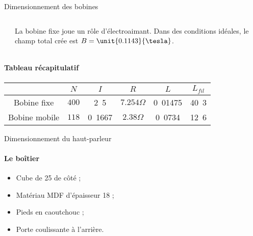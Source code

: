\documentclass[pdf]{beamer}
\begin{document}
\begin{frame}{Dimensionnement des bobines}

	\begin{columns}
		\begin{column}{5cm}
		\end{column}

		\begin{column}{5cm}
			La bobine fixe joue un rôle d'électroaimant. Dans des conditions idéales, le champ total crée est $B = \unit{0.1143}{\tesla}$.
		\end{column}
	\end{columns}

	\bigbreak

	\paragraph{\textbf{Tableau récapitulatif}}
	\small
	{
		\begin{center}
		\begin{tabular}{c|c|c|c|c|c}
										& $N$ 	& $I$ 										& $R$ 								& $L$ 										& $L_{fil}$ \\
			\hline
			Bobine fixe 	& $400$ & \unit{2.5}{\ampere} 		& $7.254\Omega$ 	& \unit{0.01475}{\henry} 	& \unit{40.3}{\meter} \\
			\hline
			Bobine mobile & $118$ & \unit{0.1667}{\ampere}  & $2.38\Omega$ 	& \unit{0.0734}{\henry} 	& \unit{12.6}{\meter} \\
		\end{tabular}
		\end{center}
	}
\end{frame}

\begin{frame}{Dimensionnement du haut-parleur}
	\framesubtitle{Le boîtier}
		\begin{itemize}
			\item Cube de \unit{25}{\centi\meter} de côté ;
			\item Matériau MDF d'épaisseur \unit{18}{\milli\meter} ;
			\item Pieds en caoutchouc ;
			\item Porte coulissante à l'arrière.
		\end{itemize}

\end{frame}
\end{document}
